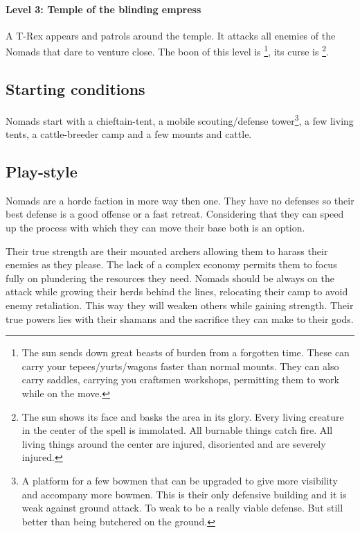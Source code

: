 \documentclass[a4paper]{book}
\begin{document}
\paragraph{Level 3: Temple of the blinding empress}
A T-Rex appears and patrols around the temple. It attacks all enemies of the
\gls{Nomads} that dare to venture close. The boon of this level is
\footnote{ The sun sends down great beasts of
	burden from a forgotten time. These can carry your tepees/yurts/wagons faster
	than normal mounts. They can also carry saddles, carrying you craftsmen
	workshops, permitting them to work while on the move. }, its curse is
\footnote{ The sun shows its face and basks the area
	in its glory. Every living creature in the center of the spell is immolated.
	All burnable things catch fire. All living things around the center are
	injured, disoriented and are severely injured. }.

\subsection{Starting conditions}
\Gls{Nomads} start with a chieftain-tent, a mobile scouting/defense tower\footnote{
	A platform for a few bowmen that can be upgraded to give more visibility
	and accompany more bowmen.
	This is their only defensive building and it is weak against ground attack.
	To weak to be a really viable defense.
	But still better than being butchered on the ground.
}, a few living tents, a cattle-breeder camp and a few mounts and cattle.

\subsection{Play-style}
\Gls{Nomads} are a horde faction in more way then one.
They have no defenses so their best defense is a good offense or a fast retreat.
Considering that they can speed up the process with which they can move
their base both is an option.

Their true strength are their mounted archers allowing them to harass their
enemies as they please. The lack of a complex economy permits them to focus
fully on plundering the resources they need. \Gls{Nomads} should be always on
the attack while growing their herds behind the lines, relocating their camp to
avoid enemy retaliation. This way they will weaken others while gaining
strength. Their true powers lies with their shamans and the sacrifice they can
make to their gods.
\end{document}
